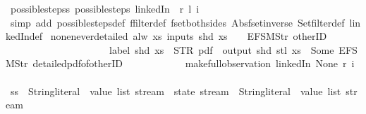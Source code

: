 \begin{isabellebody}
\endisatagproof
{\isafoldproof}%
%
\isadelimproof
\isanewline
%
\endisadelimproof
\isanewline
{}\isamarkupfalse%
\ possible{\isacharunderscore}steps{\isacharunderscore}s{}{\isacharcolon}\ {\isachardoublequoteopen}possible{\isacharunderscore}steps\ linkedIn\ {}\ r\ l\ i\ {\isacharequal}\ {\isacharbraceleft}{\isacharbar}{\isacharbar}{\isacharbraceright}{\isachardoublequoteclose}\isanewline
%
\isadelimproof
\ \ %
\endisadelimproof
%
\isatagproof
{}\isamarkupfalse%
\ {\isacharparenleft}simp\ add{\isacharcolon}\ possible{\isacharunderscore}steps{\isacharunderscore}def\ ffilter{\isacharunderscore}def\ fset{\isacharunderscore}both{\isacharunderscore}sides\ Abs{\isacharunderscore}fset{\isacharunderscore}inverse\ Set{\isachardot}filter{\isacharunderscore}def\ linkedIn{\isacharunderscore}def{\isacharparenright}%
\endisatagproof
{\isafoldproof}%
%
\isadelimproof
\isanewline
%
\endisadelimproof
\isanewline
{}\isamarkupfalse%
\ none{\isacharunderscore}never{\isacharunderscore}detailed{\isacharcolon}\ {\isachardoublequoteopen}alw\ {\isacharparenleft}{\isasymlambda}xs{\isachardot}\ inputs\ {\isacharparenleft}shd\ xs{\isacharparenright}\ {\isacharbang}\ {}\ {\isacharequal}\ EFSM{\isachardot}Str\ {\isacharprime}{\isacharprime}otherID{\isacharprime}{\isacharprime}\ {\isasymlongrightarrow}\isanewline
\ \ \ \ \ \ \ \ \ \ \ \ \ \ \ \ \ \ \ \ \ label\ {\isacharparenleft}shd\ xs{\isacharparenright}\ {\isacharequal}\ STR\ {\isacharprime}{\isacharprime}pdf{\isacharprime}{\isacharprime}\ {\isasymlongrightarrow}\ output\ {\isacharparenleft}shd\ {\isacharparenleft}stl\ xs{\isacharparenright}{\isacharparenright}\ {\isasymnoteq}\ {\isacharbrackleft}Some\ {\isacharparenleft}EFSM{\isachardot}Str\ {\isacharprime}{\isacharprime}detailed{\isacharunderscore}pdf{\isacharunderscore}of{\isacharunderscore}otherID{\isacharprime}{\isacharprime}{\isacharparenright}{\isacharbrackright}{\isacharparenright}\isanewline
\ \ \ \ \ \ \ \ \ \ \ \ {\isacharparenleft}make{\isacharunderscore}full{\isacharunderscore}observation\ linkedIn\ None\ r\ i{\isacharparenright}{\isachardoublequoteclose}\isanewline
%
\isadelimproof
%
\endisadelimproof
%
\isatagproof
{}\isamarkupfalse%
\ {\isacharminus}\isanewline
\ \ \isamarkupfalse%
\ ss\ {\isacharcolon}{\isacharcolon}\ {\isachardoublequoteopen}{\isacharparenleft}{\isacharparenleft}String{\isachardot}literal\ {\isasymtimes}\ value\ list{\isacharparenright}\ stream\ {\isasymRightarrow}\ state\ stream{\isacharparenright}\ {\isasymRightarrow}\ {\isacharparenleft}String{\isachardot}literal\ {\isasymtimes}\ value\ list{\isacharparenright}\ stream{\isachardoublequoteclose}\ \isanewline

\end{isabellebody}
